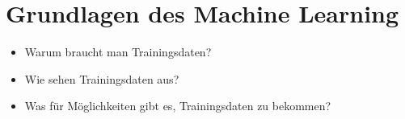\chapter{Grundlagen des Machine Learning}

\begin{itemize}
    \item Warum braucht man Trainingsdaten?
    \item Wie sehen Trainingsdaten aus?
    \item Was für Möglichkeiten gibt es, Trainingsdaten zu bekommen?
\end{itemize}